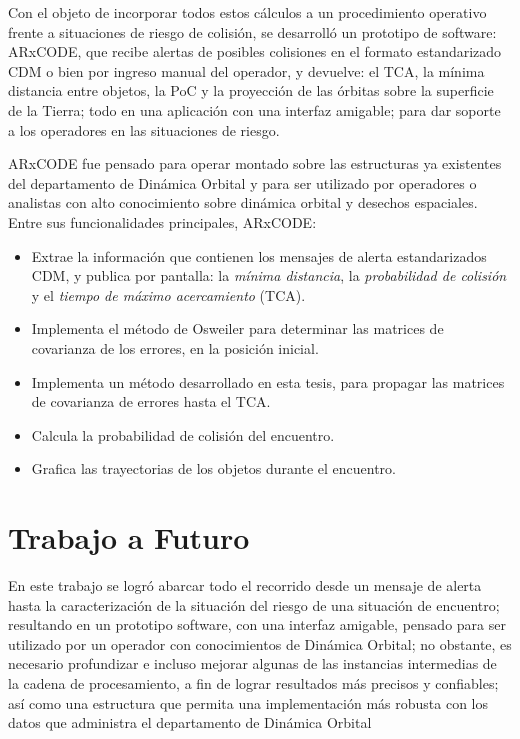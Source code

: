 Con el objeto de incorporar todos estos c\'alculos a un procedimiento operativo frente a situaciones de riesgo de colisi\'on, se desarroll\'o un prototipo de software: ARxCODE, que recibe alertas de posibles colisiones en el formato estandarizado CDM o bien por ingreso manual del operador, y devuelve: el TCA, la m\'inima distancia entre objetos, la PoC y la proyecci\'on de las \'orbitas sobre la superficie de la Tierra; todo en una aplicaci\'on con una interfaz amigable; para dar soporte a los operadores en las situaciones de riesgo. 

ARxCODE fue pensado para operar montado sobre las estructuras ya existentes del departamento de Din\'amica Orbital y para ser utilizado por operadores o analistas con alto conocimiento sobre din\'amica orbital y desechos espaciales.\\

Entre sus funcionalidades principales, ARxCODE:\\

\begin{itemize}
 \item Extrae la informaci\'on que contienen los mensajes de alerta estandarizados CDM, y publica por pantalla: la {\it{m\'inima distancia}}, la {\it{probabilidad de colisi\'on}} y el {\it{tiempo de m\'aximo acercamiento}} (TCA). 
 \item Implementa el m\'etodo de Osweiler \citep{osweiler} para determinar las matrices de covarianza de los errores, en la posici\'on inicial.
 \item Implementa un m\'etodo desarrollado en esta tesis, para propagar las matrices de covarianza de errores hasta el TCA.
 \item Calcula la probabilidad de colisi\'on del encuentro.
 \item Grafica las trayectorias de los objetos durante el encuentro.
\end{itemize}


\section*{Trabajo a Futuro}

En este trabajo se logr\'o abarcar todo el recorrido desde un mensaje de alerta hasta la caracterizaci\'on de la situaci\'on del riesgo de una situaci\'on de encuentro; resultando en un prototipo software, con una interfaz amigable, pensado para ser utilizado por un operador con conocimientos de Din\'amica Orbital; no obstante, es necesario profundizar e incluso mejorar algunas de las instancias intermedias de la cadena de procesamiento, a fin de lograr resultados m\'as precisos y confiables; as\'i como una estructura que permita una implementaci\'on m\'as robusta con los datos que administra el departamento de Din\'amica Orbital\\

